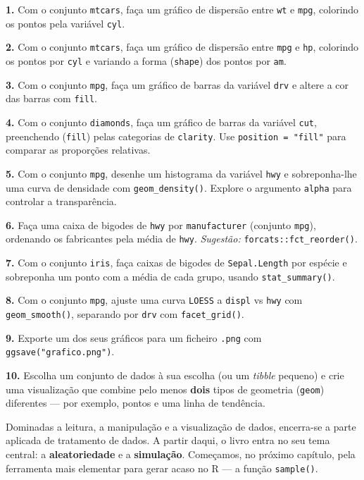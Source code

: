 \documentclass[
  portuguese,
  11pt,
  openany]{book}
\begin{document}
\textbf{1.} Com o conjunto \texttt{mtcars}, faça um gráfico de dispersão entre \texttt{wt} e \texttt{mpg},
colorindo os pontos pela variável \texttt{cyl}.

\textbf{2.} Com o conjunto \texttt{mtcars}, faça um gráfico de dispersão entre \texttt{mpg} e \texttt{hp},
colorindo os pontos por \texttt{cyl} e variando a forma (\texttt{shape}) dos pontos por \texttt{am}.

\textbf{3.} Com o conjunto \texttt{mpg}, faça um gráfico de barras da variável \texttt{drv} e altere a cor
das barras com \texttt{fill}.

\textbf{4.} Com o conjunto \texttt{diamonds}, faça um gráfico de barras da variável \texttt{cut},
preenchendo (\texttt{fill}) pelas categorias de \texttt{clarity}. Use \texttt{position\ =\ "fill"} para
comparar as proporções relativas.

\textbf{5.} Com o conjunto \texttt{mpg}, desenhe um histograma da variável \texttt{hwy} e sobreponha-lhe
uma curva de densidade com \texttt{geom\_density()}. Explore o argumento \texttt{alpha} para controlar
a transparência.

\textbf{6.} Faça uma caixa de bigodes de \texttt{hwy} por \texttt{manufacturer} (conjunto \texttt{mpg}),
ordenando os fabricantes pela média de \texttt{hwy}.
\emph{Sugestão:} \texttt{forcats::fct\_reorder()}.

\textbf{7.} Com o conjunto \texttt{iris}, faça caixas de bigodes de \texttt{Sepal.Length} por espécie e
sobreponha um ponto com a média de cada grupo, usando \texttt{stat\_summary()}.

\textbf{8.} Com o conjunto \texttt{mpg}, ajuste uma curva \texttt{LOESS} a \texttt{displ} vs \texttt{hwy} com
\texttt{geom\_smooth()}, separando por \texttt{drv} com \texttt{facet\_grid()}.

\textbf{9.} Exporte um dos seus gráficos para um ficheiro \texttt{.png} com
\texttt{ggsave("grafico.png")}.

\textbf{10.} Escolha um conjunto de dados à sua escolha (ou um \emph{tibble} pequeno) e crie uma
visualização que combine pelo menos \textbf{dois} tipos de geometria (\texttt{geom}) diferentes
--- por exemplo, pontos e uma linha de tendência.

Dominadas a leitura, a manipulação e a visualização de dados, encerra-se a parte
aplicada de tratamento de dados. A partir daqui, o livro entra no seu tema central: a
\textbf{aleatoriedade} e a \textbf{simulação}. Começamos, no próximo capítulo, pela ferramenta
mais elementar para gerar acaso no R --- a função \texttt{sample()}.
\end{document}
